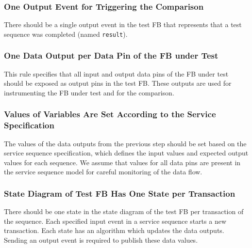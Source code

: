 \begin{bibunit}
\subsubsection{One Output Event for Triggering the Comparison}
There should be a single output event in the test FB that represents that a test sequence was completed (named \texttt{result}).

\subsubsection{One Data Output per Data Pin of the FB under Test}
This rule specifies that all input and output data pins of the FB under test should be exposed as output pins in the test FB. These outputs are used for instrumenting the FB under test and for the comparison.

\subsubsection{Values of Variables Are Set According to the Service Specification}
The values of the data outputs from the previous step should be set based on the service sequence specification, which defines the input values and expected output values for each sequence. We assume that values for all data pins are present in the service sequence model for careful monitoring of the data flow. %

\subsubsection{State Diagram of Test FB Has One State per Transaction}%
There should be one state in the state diagram of the test FB per transaction of the sequence. Each specified input event in a service sequence starts a new transaction. Each state has an algorithm which updates the data outputs. Sending an output event is required to publish these data values.


\end{bibunit}
